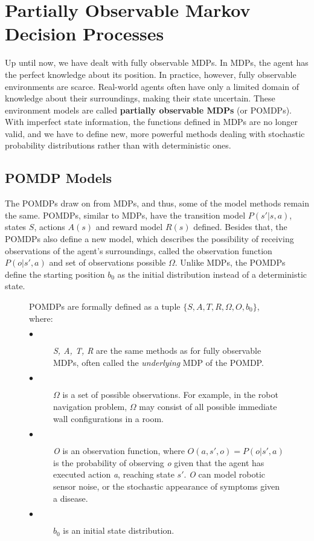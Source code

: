 \newcommand{\norm}[1]{\left\lVert#1\right\rVert}


\chapter{Partially Observable Markov Decision Processes}


Up until now, we have dealt with fully observable MDPs. In MDPs, the agent has the perfect knowledge about its position. In practice, however, fully observable environments are scarce. Real-world agents often have only a limited domain of knowledge about their surroundings, making their state uncertain. These environment models are called \textbf{partially observable MDPs} (or POMDPs). With imperfect state information, the functions defined in MDPs are no longer valid, and we have to define new, more powerful methods dealing with stochastic probability distributions rather than with deterministic ones.

\section{POMDP Models}

The POMDPs draw on from MDPs, and thus, some of the model methods remain the same. POMDPs, similar to MDPs, have the transition model $P(s'|s,a)$, states $S$, actions $A(s)$ and reward model $R(s)$ defined. Besides that, the POMDPs also define a new model, which describes the possibility of receiving observations of the agent's surroundings, called the observation function $P(o|s', a)$ and set of observations possible $\Omega$. Unlike MDPs, the POMDPs define the starting position $b_0$ as the initial distribution instead of a deterministic state. 


\begin{figure}[h]
\begin{definition}\label{def:POMDP}
POMDPs \cite{Shani2013} are formally defined as a tuple $\{S, A, T, R, \Omega, O, b_0\}$, where:
\begin{description}
  \item[$\bullet$ ] \textit{S, A, T, R} are the same methods as for fully observable MDPs, often called the \textit{underlying} MDP of the POMDP.
  \item[$\bullet$ ] $\Omega$ is a set of possible observations. For example, in the robot navigation problem, $\Omega$ may consist of all possible immediate wall configurations in a room.
  \item[$\bullet$ ] \textit{O} is an observation function, where $O(a, s', o) = P(o|s', a)$ is the probability of observing \textit{o} given that the agent has executed action \textit{a}, reaching state \textit{$s'$}. \textit{O} can model
robotic sensor noise, or the stochastic appearance of symptoms given a disease.
  \item[$\bullet$ ] $b_0$ is an initial state distribution.
\end{description}

\end{definition}
\end{figure}

